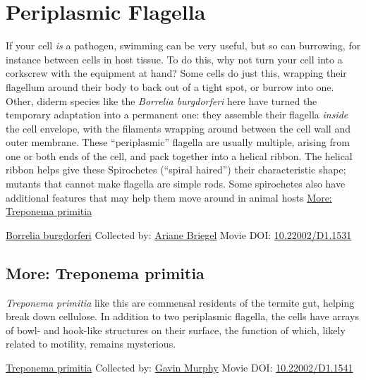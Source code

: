 \documentclass[]{tufte-book}
\begin{document}
\hypertarget{periplasmic-flagella}{%
\section{Periplasmic Flagella}\label{periplasmic-flagella}}

If your cell \emph{is} a pathogen, swimming can be very useful, but so can burrowing, for instance between cells in host tissue. To do this, why not turn your cell into a corkscrew with the equipment at hand? Some cells do just this, wrapping their flagellum around their body to back out of a tight spot, or burrow into one. Other, diderm species like the \emph{Borrelia burgdorferi} here have turned the temporary adaptation into a permanent one: they assemble their flagella \emph{inside} the cell envelope, with the filaments wrapping around between the cell wall and outer membrane. These ``periplasmic'' flagella are usually multiple, arising from one or both ends of the cell, and pack together into a helical ribbon. The helical ribbon helps give these Spirochetes (``spiral haired'') their characteristic shape; mutants that cannot make flagella are simple rods. Some spirochetes also have additional features that may help them move around in animal hosts \protect\hyperlink{Treponema_primitia}{More: Treponema primitia}



\hypertarget{htmlwidget-dfe6d7590dfcde648e35}{}

\label{fig:6-7}\protect\hyperlink{tree}{Borrelia burgdorferi} Collected by: \protect\hyperlink{ariane_briegel}{Ariane Briegel} Movie DOI: \href{https://doi.org/10.22002/D1.1531}{10.22002/D1.1531}

\hypertarget{Treponema_primitia}{%
\subsection*{More: Treponema primitia}\label{Treponema_primitia}}

\emph{Treponema primitia} like this are commensal residents of the termite gut, helping break down cellulose. In addition to two periplasmic flagella, the cells have arrays of bowl- and hook-like structures on their surface, the function of which, likely related to motility, remains mysterious.



\hypertarget{htmlwidget-c6725f50e6122e08607c}{}

\label{fig:6-7a}\protect\hyperlink{tree}{Treponema primitia} Collected by: \protect\hyperlink{gavin_murphy}{Gavin Murphy} Movie DOI: \href{https://doi.org/10.22002/D1.1541}{10.22002/D1.1541}
\end{document}
